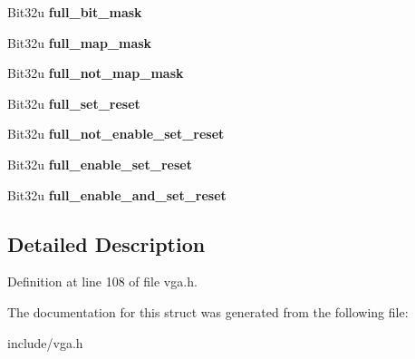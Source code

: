 \begin{DoxyCompactItemize}
\item 
\hypertarget{structVGA__Config_aeafb31cb767815375d30a6f0ba48e319}{Bit32u {\bfseries full\-\_\-bit\-\_\-mask}}\label{structVGA__Config_aeafb31cb767815375d30a6f0ba48e319}

\item 
\hypertarget{structVGA__Config_a4b6aad5a5153cac8c62619fec4fe15b4}{Bit32u {\bfseries full\-\_\-map\-\_\-mask}}\label{structVGA__Config_a4b6aad5a5153cac8c62619fec4fe15b4}

\item 
\hypertarget{structVGA__Config_a9621b79f2d85534101795b9a38e6c165}{Bit32u {\bfseries full\-\_\-not\-\_\-map\-\_\-mask}}\label{structVGA__Config_a9621b79f2d85534101795b9a38e6c165}

\item 
\hypertarget{structVGA__Config_ac7477048acf903ad2b40036fd7e17f8e}{Bit32u {\bfseries full\-\_\-set\-\_\-reset}}\label{structVGA__Config_ac7477048acf903ad2b40036fd7e17f8e}

\item 
\hypertarget{structVGA__Config_a7317f0353f9262ed950c47779ead4a45}{Bit32u {\bfseries full\-\_\-not\-\_\-enable\-\_\-set\-\_\-reset}}\label{structVGA__Config_a7317f0353f9262ed950c47779ead4a45}

\item 
\hypertarget{structVGA__Config_a045f0b43adea277828837e3cc956000e}{Bit32u {\bfseries full\-\_\-enable\-\_\-set\-\_\-reset}}\label{structVGA__Config_a045f0b43adea277828837e3cc956000e}

\item 
\hypertarget{structVGA__Config_ac1a974050a7c80f93935ad23fc5ba1f5}{Bit32u {\bfseries full\-\_\-enable\-\_\-and\-\_\-set\-\_\-reset}}\label{structVGA__Config_ac1a974050a7c80f93935ad23fc5ba1f5}

\end{DoxyCompactItemize}


\subsection{Detailed Description}


Definition at line 108 of file vga.\-h.



The documentation for this struct was generated from the following file\-:\begin{DoxyCompactItemize}
\item 
include/vga.\-h\end{DoxyCompactItemize}
